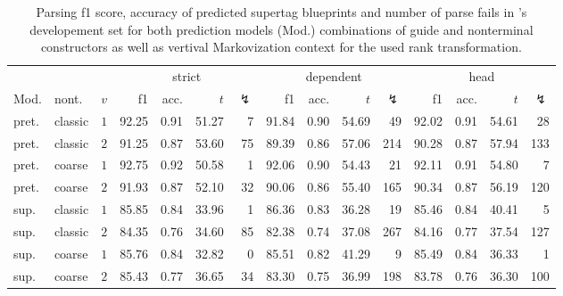 \documentclass[../../document.tex]{subfiles}
\begin{document}
    \begin{table}
        \caption{\label{tbl:experiments:tiger}
        Parsing f1 score, accuracy of predicted supertag blueprints and number of parse fails in 's developement set for both prediction models (Mod.) combinations of guide and nonterminal constructors as well as vertival Markovization context for the used rank transformation.
        }
        \centering
        \setlength{\tabcolsep}{4pt}
        \vspace{.2cm}
        \begin{tabular}{llc|rrrr|rrrr|rrrr}
            \toprule
         &    &        & \multicolumn{4}{c|}{strict} & \multicolumn{4}{c|}{dependent} & \multicolumn{4}{c}{head}  \\
    Mod. & nont.   &\(v\)   & f1 & acc. & $t$ & $\lightning$ & f1 & acc. & $t$ & $\lightning$ & f1 & acc. & $t$ & $\lightning$ \\ \hline
    pret. & classic & \(1\)  & 92.25 & 0.91 & 51.27 & 7 & 91.84 & 0.90 & 54.69 & 49 & 92.02 & 0.91 & 54.61 & 28 \\
    pret. & classic & \(2\)  & 91.25 & 0.87 & 53.60 & 75 & 89.39 & 0.86 & 57.06 & 214 & 90.28 & 0.87 & 57.94 & 133 \\
    pret. & coarse  & \(1\)  & 92.75 & 0.92 & 50.58 & 1 & 92.06 & 0.90 & 54.43 & 21 & 92.11 & 0.91 & 54.80 & 7 \\
    pret. & coarse  & \(2\)  & 91.93 & 0.87 & 52.10 & 32 & 90.06 & 0.86 & 55.40 & 165 & 90.34 & 0.87 & 56.19 & 120 \\
    \midrule
    sup. & classic & \(1\)  & 85.85 & 0.84 & 33.96 & 1 & 86.36 & 0.83 & 36.28 & 19 & 85.46 & 0.84 & 40.41 & 5 \\
    sup. & classic & \(2\)  & 84.35 & 0.76 & 34.60 & 85 & 82.38 & 0.74 & 37.08 & 267 & 84.16 & 0.77 & 37.54 & 127 \\
    sup. & coarse  & \(1\)  & 85.76 & 0.84 & 32.82 & 0 & 85.51 & 0.82 & 41.29 & 9 & 85.49 & 0.84 & 36.33 & 1 \\
    sup. & coarse  & \(2\)  & 85.43 & 0.77 & 36.65 & 34 & 83.30 & 0.75 & 36.99 & 198 & 83.78 & 0.76 & 36.30 & 100 \\
    \bottomrule
        \end{tabular}
    \end{table}
\end{document}

